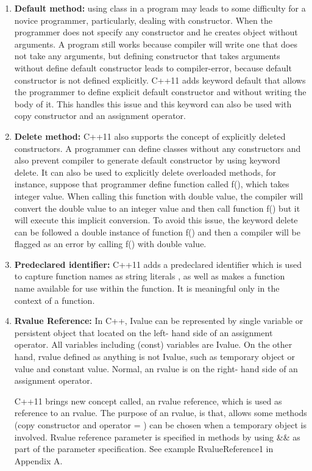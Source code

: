 \documentclass[11pt]{report}
\begin{document}
\begin{enumerate}
\item \textbf{Default method:} using class in a program may leads to some difficulty for a novice programmer, particularly, dealing with constructor. When the programmer does not specify any constructor and he creates object without arguments. A program still works because compiler will write one that does not take any arguments, but defining constructor that takes arguments without define default constructor leads to compiler-error, because default constructor is not defined explicitly. C++11 adds keyword default that allows the programmer to define explicit default constructor and without writing the body of it. This handles this issue and this keyword can also be used with copy constructor and an assignment operator\cite{Gregorie:professionalcpp}. 

\item \textbf{Delete method:} C++11 also supports the concept of explicitly deleted constructors.  A programmer can define classes without any constructors and also prevent compiler to generate default constructor by using keyword delete.  It can also be used to explicitly delete overloaded methods, for instance, suppose that programmer define function called f(), which takes integer value. When calling this function with double value, the compiler will convert the double value to an integer value and then call function f() but it will execute this implicit conversion. To avoid this issue, the keyword delete can be followed a double instance of function f() and then a compiler will be flagged as an error by calling f() with double value\cite{Gregorie:professionalcpp}.
  
\item \textbf{Predeclared identifier:} C++11 adds a predeclared identifier which is used to capture function names as string literals , as well as makes a function name available for use within the function. It is meaningful only in the context of a function\cite{Gregorie:professionalcpp}.

\item \textbf{Rvalue Reference:} In C++, Ivalue can be represented by single variable or persistent object that located on the left- hand side of an   assignment operator. All variables including (const) variables are Ivalue. On the other hand, rvalue defined as anything is not Ivalue, such as temporary object or value and constant value. Normal, an rvalue is on the right- hand side of an assignment operator. 

C++11 brings new concept called, an rvalue reference, which is used as reference to an rvalue. The purpose of an rvalue, is that, allows some methods (copy constructor and operator = ) can be chosen when a temporary object is involved. Rvalue reference parameter is specified in methods by using \&\& as part of the parameter specification\cite{Gregorie:professionalcpp}. See example RvalueReference1 in Appendix A. 
\end{enumerate}
 
\end{document}
